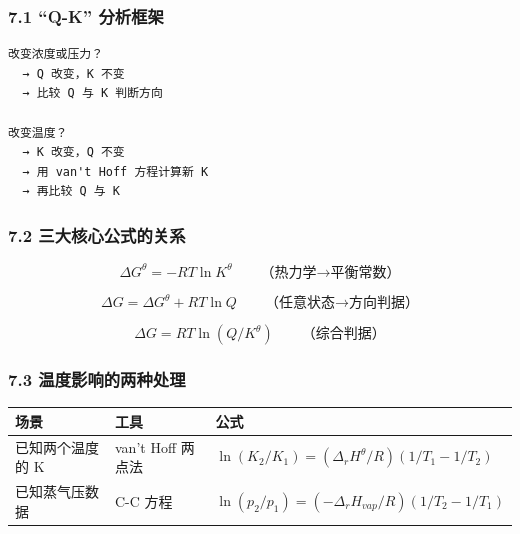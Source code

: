 \documentclass[a4paper,11pt]{ctexart}
\newcounter{none}
\newcommand{\箭}{\ensuremath{\rightarrow}}
\newcommand{\左箭}{\ensuremath{\leftarrow}}
\newcommand{\上箭}{\ensuremath{\uparrow}}
\newcommand{\下箭}{\ensuremath{\downarrow}}
\newcommand{\衡}{\ensuremath{\rightleftharpoons}}
\newcommand{\双箭}{\ensuremath{\leftrightarrow}}
\newcommand{\约等于}{\ensuremath{\approx}}
\newcommand{\小于等于}{\ensuremath{\leq}}
\newcommand{\大于等于}{\ensuremath{\geq}}
\newcommand{\不等于}{\ensuremath{\neq}}
\newcommand{\西格马}{\ensuremath{\sigma}}
\newcommand{\派}{\ensuremath{\pi}}
\begin{document}
\subsubsection{7.1 ``Q-K'' 分析框架}\label{q-k-ux5206ux6790ux6846ux67b6}

\begin{verbatim}
改变浓度或压力？
  → Q 改变，K 不变
  → 比较 Q 与 K 判断方向

改变温度？
  → K 改变，Q 不变
  → 用 van't Hoff 方程计算新 K
  → 再比较 Q 与 K
\end{verbatim}

\subsubsection{7.2 三大核心公式的关系}\label{ux4e09ux5927ux6838ux5fc3ux516cux5f0fux7684ux5173ux7cfb}

\[\Delta G^\theta = -RT \ln K^\theta \qquad \text{（热力学→平衡常数）}\]

\[\Delta G = \Delta G^\theta + RT \ln Q \qquad \text{（任意状态→方向判据）}\]

\[\Delta G = RT \ln(Q/K^\theta) \qquad \text{（综合判据）}\]

\subsubsection{7.3 温度影响的两种处理}\label{ux6e29ux5ea6ux5f71ux54cdux7684ux4e24ux79cdux5904ux7406}

{\def\LTcaptype{none} %
\begin{longtable}[]{@{}
  >{\raggedright\arraybackslash}p{}
  >{\raggedright\arraybackslash}p{}
  >{\raggedright\arraybackslash}p{}@{}}
\toprule\noalign{}
\begin{minipage}[b]{\linewidth}\raggedright
场景
\end{minipage} & \begin{minipage}[b]{\linewidth}\raggedright
工具
\end{minipage} & \begin{minipage}[b]{\linewidth}\raggedright
公式
\end{minipage} \\
\midrule\noalign{}
\endhead
\bottomrule\noalign{}
\endlastfoot
已知两个温度的 K & van't Hoff 两点法 & \(\ln(K_2/K_1) = (\Delta_r H^\theta/R)(1/T_1 - 1/T_2)\) \\
已知蒸气压数据 & C-C 方程 & \(\ln(p_2/p_1) = (-\Delta_r H_{vap}/R)(1/T_2 - 1/T_1)\) \\
\end{longtable}
}
\end{document}
